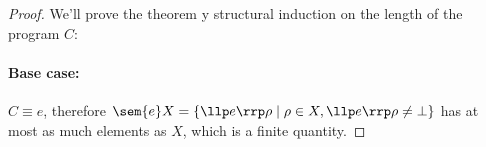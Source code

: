 \begin{proof}
  We'll prove the theorem y structural induction on the length of the
  program \(C\):
  \paragraph*{Base case: \\}
  \(C \equiv e\), therefore \(\sem{e} X = \{\llp e \rrp \rho \mid \rho
  \in X , \llp e \rrp \rho \neq \bot\}\) has at most as much elements
  as \(X\), which is a finite quantity.

\end{proof}

